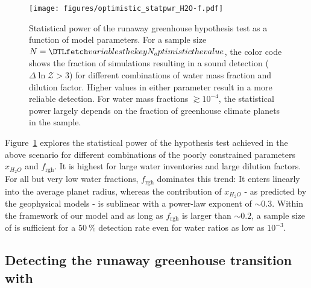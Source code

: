 \documentclass[twocolumn,twocolappendix,linenumbers]{aastex631}
\begin{document}
\begin{figure}[ht!]
    \begin{centering}
        \texttt{[image: figures/optimistic\_statpwr\_H2O-f.pdf]}
        \caption{
            Statistical power of the runaway greenhouse hypothesis test as a function of model parameters.
            For a sample size $N = \var{N_optimistic}$, the color code shows the fraction of simulations resulting in a sound detection ($\Delta \ln \mathcal{Z} > 3$) for different combinations of  water mass fraction and dilution factor.
            Higher values in either parameter result in a more reliable detection.
            For water mass fractions $\gtrsim 10^{-4}$, the statistical power largely depends on the fraction of greenhouse climate planets in the sample.
        }
        \label{fig:statpwr_H2O-f}
    \end{centering}
\end{figure}
Figure~\ref{fig:statpwr_H2O-f} explores the statistical power of the hypothesis test achieved in the above scenario for different combinations of the poorly constrained parameters $x_{H_2O}$ and $f_\mathrm{rgh}$.
It is highest for large water inventories and large dilution factors.
 For all but very low water fractions, $f_\mathrm{rgh}$ dominates this trend: It enters linearly into the average planet radius, whereas the contribution of $x_{H_2O}$ - as predicted by the geophysical models - is sublinear with a power-law exponent of $\sim 0.3$.
Within the framework of our model and as long as $f_\mathrm{rgh}$ is larger than $\sim 0.2$, a sample size of  is sufficient for a $\SI{50}{\percent}$ detection rate even for water ratios as low as $10^{-3}$.



\subsection{Detecting the runaway greenhouse transition with \plato}\label{sec:res_samplesize}
\end{document}
